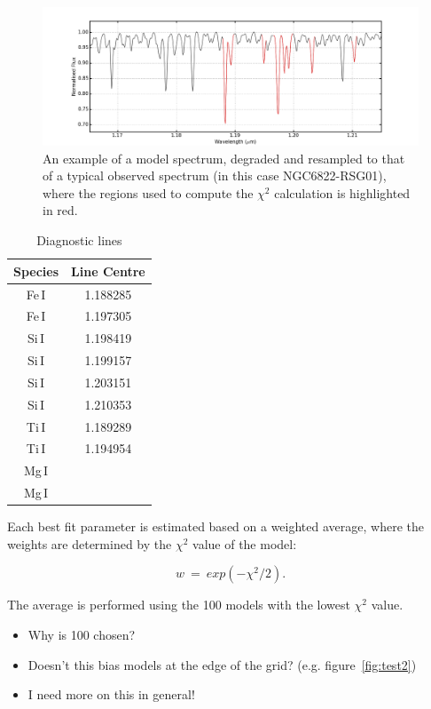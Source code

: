 \begin{figure}
 \centering
 \includegraphics[width=\textwidth]{JAnal/Diag-lines}
 \caption[Diagnostic lines]{
An example of a model spectrum, degraded and resampled to that of a typical observed spectrum (in this case NGC6822-RSG01), where the regions used to compute the $\chi^{2}$ calculation is highlighted in red.\label{fig:lines}
         }
\end{figure}

\begin{table}
\caption[Diagnostic lines]{Diagnostic lines\label{tb:lines}}
\scriptsize
\begin{center}
\begin{tabular}{cc}
 \hline
 \hline
Species & Line Centre \\
 \hline
Fe\,I & 1.188285 \\
Fe\,I & 1.197305 \\
Si\,I & 1.198419 \\
Si\,I & 1.199157 \\
Si\,I & 1.203151 \\
Si\,I & 1.210353 \\
Ti\,I & 1.189289 \\
Ti\,I & 1.194954 \\
Mg\,I & \\
Mg\,I & \\
 \hline
\end{tabular}
\end{center}
\end{table}

Each best fit parameter is estimated based on a weighted average,
where the weights are determined by the $\chi^{2}$ value of the model:

\begin{equation}
    w~=~exp(-\chi^{2}/2).
\end{equation}

The average is performed using the 100 models with the lowest $\chi^{2}$ value.
\begin{itemize}
    \item Why is 100 chosen?
    \item Doesn't this bias models at the edge of the grid? (e.g. figure~\ref{fig:test2})
    \item I need more on this in general!
\end{itemize}

